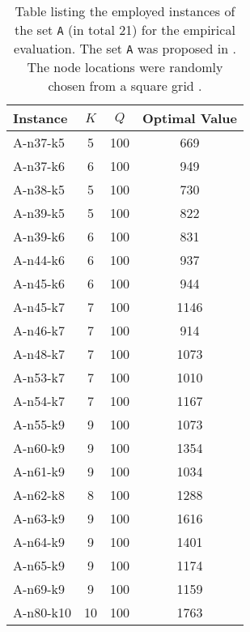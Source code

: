 \begin{table*}[thb]
	\centering
	\begin{tabular}[t]{lccc}
		\toprule
		\textbf{Instance} & $K$ & $Q$ & \textbf{Optimal Value} \\
		\midrule
		A-n37-k5          & 5   & 100 & 669                    \\
		A-n37-k6          & 6   & 100 & 949                    \\
		A-n38-k5          & 5   & 100 & 730                    \\
		A-n39-k5          & 5   & 100 & 822                    \\
		A-n39-k6          & 6   & 100 & 831                    \\
		A-n44-k6          & 6   & 100 & 937                    \\
		A-n45-k6          & 6   & 100 & 944                    \\
		A-n45-k7          & 7   & 100 & 1146                   \\
		A-n46-k7          & 7   & 100 & 914                    \\
		A-n48-k7          & 7   & 100 & 1073                   \\
		A-n53-k7          & 7   & 100 & 1010                   \\
		A-n54-k7          & 7   & 100 & 1167                   \\
		A-n55-k9          & 9   & 100 & 1073                   \\
		A-n60-k9          & 9   & 100 & 1354                   \\
		A-n61-k9          & 9   & 100 & 1034                   \\
		A-n62-k8          & 8   & 100 & 1288                   \\
		A-n63-k9          & 9   & 100 & 1616                   \\
		A-n64-k9          & 9   & 100 & 1401                   \\
		A-n65-k9          & 9   & 100 & 1174                   \\
		A-n69-k9          & 9   & 100 & 1159                   \\
		A-n80-k10         & 10  & 100 & 1763                   \\
		\bottomrule
	\end{tabular}
	\caption{
		Table listing the employed instances of the set \texttt{A} (in total 21) for the empirical evaluation.
		The set \texttt{A} was proposed in \textcite{augerat1995}.
		The node locations were randomly chosen from a square grid \parencite{uchoa2017}.
	}
	\label{table:cvrp-instance-family-A}
\end{table*}

